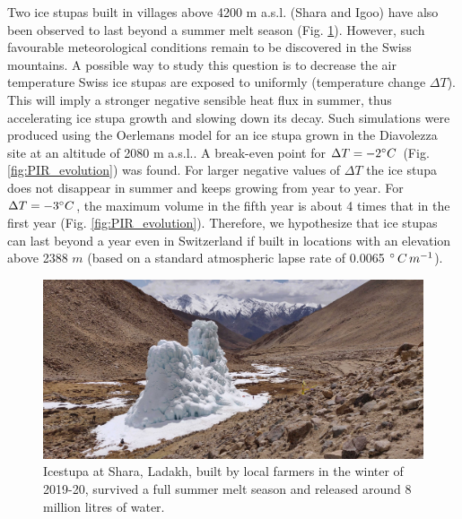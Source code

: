 Two ice stupas built in villages above 4200 m \ac{a.s.l.} (Shara and Igoo) have also been observed to last
beyond a summer melt season (Fig. \ref{fig:PIR}). However, such favourable meteorological conditions remain to
be discovered in the Swiss mountains. A possible way to study this question is to decrease the air temperature
Swiss ice stupas are exposed to uniformly (temperature change $\Delta T$). This will imply a stronger negative
sensible heat flux in summer, thus accelerating ice stupa growth and slowing down its decay. Such simulations
were produced using the Oerlemans model for an ice stupa grown in the Diavolezza site at an altitude of 2080 m
\ac{a.s.l.}. A break-even point for $\Delta T = -2 ^{\circ} C$ (Fig. \ref{fig:PIR_evolution}) was found. For
larger negative values of $\Delta T$ the ice stupa does not disappear in summer and keeps growing from year to
year. For $\Delta T = -3 ^{\circ} C$, the maximum volume in the fifth year is about 4 times that in the first
year (Fig. \ref{fig:PIR_evolution}). Therefore, we hypothesize that ice stupas can last beyond a year even in
Switzerland if built in locations with an elevation above 2388 $m$ (based on a standard atmospheric lapse rate
of 0.0065 $^{\circ}\,C\,m^{-1}$).

\begin{figure}
	\centering
	\includegraphics[width=\textwidth]{figs/PIR_example.jpg}

	\caption{Icestupa at Shara, Ladakh, built by local farmers in the winter of 2019-20, survived a full summer melt season and released
		around 8 million litres of water.}

	\label{fig:PIR}
\end{figure}

